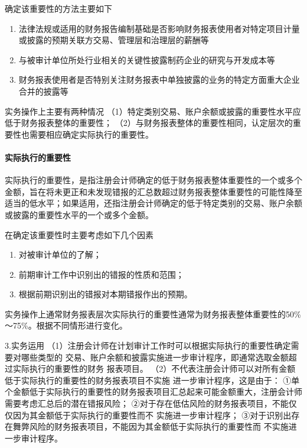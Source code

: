 \documentclass[UTF8,12pt]{ctexart}
\numberwithin{equation}{section} %
\numberwithin{figure}{section}
\numberwithin{table}{section}
\begin{document}
	确定该重要性的方法主要如下
	\begin{enumerate}
		\item 法律法规或适用的财务报告编制基础是否影响财务报表使用者对特定项目计量或披露的预期关联方交易、管理层和治理层的薪酬等
		
		\item 与被审计单位所处行业相关的关键性披露制药企业的研究与开发成本等
		
		\item 财务报表使用者是否特别关注财务报表中单独披露的业务的特定方面重大企业合并的披露等
	\end{enumerate}
	
	
	实务操作上主要有两种情况
	（1）特定类别交易、账户余额或披露的重要性水平应低于财务报表整体的重要性；
	（2）与财务报表整体的重要性相同，认定层次的重要性也需要相应确定实际执行的重要性。
	
	\paragraph{实际执行的重要性}
	
	实际执行的重要性，是指注册会计师确定的低于财务报表整体重要性的一个或多个金额，旨在将未更正和未发现错报的汇总数超过财务报表整体重要性的可能性降至适当的低水平；如果适用，还指注册会计师确定的低于特定类别的交易、账户余额或披露的重要性水平的一个或多个金额。
	
	在确定该重要性时主要考虑如下几个因素
	\begin{enumerate}
		\item 对被审计单位的了解；
		
		\item 前期审计工作中识别出的错报的性质和范围；
		
		\item 根据前期识别出的错报对本期错报作出的预期。
	\end{enumerate}
	
	实务操作上通常财务报表层次实际执行的重要性通常为财务报表整体重要性的50\%～75\%。根据不同情形进行变化。
	
	3.实务运用
	（1）注册会计师在计划审计工作时可以根据实际执行的重要性确定需要对哪些类型的
	交易、账户余额和披露实施进一步审计程序，即通常选取金额超过实际执行的重要性的财务
	报表项目。
	（2）不代表注册会计师可以对所有金额低于实际执行的重要性的财务报表项目不实施
	进一步审计程序，这是由于：
	①单个金额低于实际执行的重要性的财务报表项目汇总起来可能金额重大，注册会计师
	需要考虑汇总后的潜在错报风险；
	②对于存在低估风险的财务报表项目，不能仅仅因为其金额低于实际执行的重要性而不
	实施进一步审计程序；
	③对于识别出存在舞弊风险的财务报表项目，不能因为其金额低于实际执行的重要性而
	不实施进一步审计程序。
	
\end{document}
